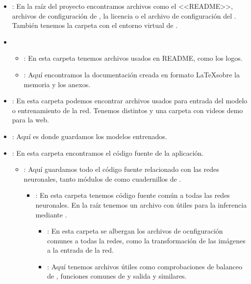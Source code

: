 \begin{itemize}

  \item \prog{/}: En la raíz del proyecto encontramos archivos como el <<README>>, archivos de configuración de , la licencia o el archivo de configuración del . También tenemos la carpeta con el entorno virtual de .

  \item {}
        \begin{itemize}
          \item {}: En esta carpeta tenemos archivos usados en README, como los logos.
          \item {}: Aquí encontramos la documentación creada en formato \LaTeX sobre la memoria y los anexos.
        \end{itemize}

  \item {}: En esta carpeta podemos encontrar archivos usados para entrada del modelo o entrenamiento de la red. Tenemos distintos  y una carpeta con videos demo para la web.

  \item {}: Aquí es donde guardamos los modelos entrenados.

  \item {}: En esta carpeta encontramos el código fuente de la aplicación.
        \begin{itemize}
          \item {}: Aquí guardamos todo el código fuente relacionado con las redes neuronales, tanto módulos de  como cuadernillos de .
                \begin{itemize}
                  \item {}: En esta carpeta tenemos código fuente común a todas las redes neuronales. En la raíz tenemos un archivo con útiles para la inferencia mediante .
                        \begin{itemize}
                          \item {}: En esta carpeta se albergan los archivos de ocnfiguración comunes a todas la redes, como la transformación de las imágenes a la entrada de la red.
                          \item {}: Aquí tenemos archivos útiles como comprobaciones de balanceo de , funciones comunes de  y salida y similares.
                        \end{itemize}


\end{itemize}
\end{itemize}
\end{itemize}
